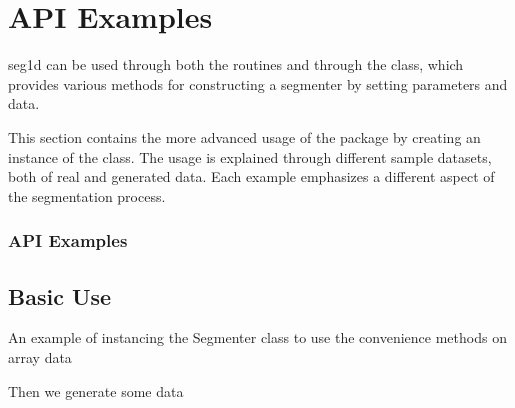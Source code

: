 \documentclass[letterpaper,10pt,english]{sphinxmanual}
\begin{document}
\begin{figure}[htbp]
\centering

\noindent{}
\end{figure}


\section{API Examples}
\label{\detokenize{api:api-examples}}\label{\detokenize{api::doc}}
\sphinxAtStartPar
seg1d can be used through both the routines and through the  class,
which provides various methods for constructing a segmenter by setting parameters and data.

\sphinxAtStartPar
This section contains the more advanced usage of the package by creating an instance
of the class. The usage is explained through different sample datasets, both of real
and generated data. Each example emphasizes a different aspect of the segmentation process.
\subsubsection*{API Examples}


\subsection{Basic Use}
\label{\detokenize{api_basic:module-seg1d.examples.ex_segmenter_sine}}\label{\detokenize{api_basic:basic-use}}\label{\detokenize{api_basic::doc}}
\sphinxAtStartPar
An example of instancing the Segmenter class to use the convenience methods on array data

\begin{sphinxVerbatim}[commandchars=\\\{\}]
 
   
   
\end{sphinxVerbatim}

\sphinxAtStartPar
Then we generate some data
\end{document}
